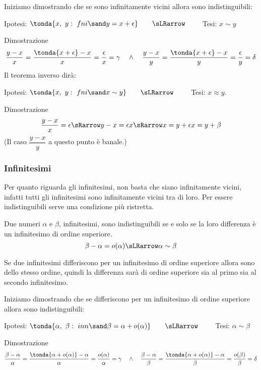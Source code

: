 Iniziamo dimostrando che se sono infinitamente vicini allora sono 
indistinguibili:
\begin{center}
Ipotesi: \(\tonda{x,~y:\ fni \sand y = x+\epsilon} \qquad \sLRarrow \qquad\) 
Tesi: \(x \sim y\)
\end{center}
Dimostrazione
\[\frac{y-x}{x}=\frac{\tonda{x+\epsilon}-x}{x} = 
\frac{\epsilon}{x}= \gamma \quad \wedge \quad 
\frac{y-x}{y}=\frac{\tonda{x+\epsilon}-x}{y} = 
\frac{\epsilon}{y}= \delta
\]
Il teorema inverso dirà:
\begin{center}
Ipotesi: \(\tonda{x,~y:\ fni \sand x \sim y} \qquad \sLRarrow \qquad\) 
Tesi: \(x \approx y\).
\end{center}
Dimostrazione
\[\frac{y-x}{x} = \epsilon
\sRarrow y-x=\epsilon x \sRarrow x=y+\epsilon x=y+\beta
\]
(Il caso $\dfrac{y-x}{y}$ a questo punto è banale.)

\subsubsection{Infinitesimi}
\label{subsubsec:insnum_infinitesimi}

Per quanto riguarda gli infinitesimi, non basta che siano infinitamente 
vicini, infatti tutti gli infinitesimi sono infinitamente vicini tra di loro.
Per essere indistinguibili serve una condizione più ristretta.

\begin{teorema}
Due numeri \(\alpha\) e \(\beta\), infinitesimi, 
sono indistinguibili se e solo se la loro differenza è un infinitesimo di 
ordine superiore.
\[\beta-\alpha = o(\alpha) \sLRarrow \alpha \sim \beta\] 
\end{teorema}

\begin{osservazione}
 Se due infinitesimi differiscono per un infinitesimo di ordine superiore 
allora sono dello stesso ordine, quindi la differenza sarà di ordine 
superiore sia al primo sia al secondo infinitesimo.
\end{osservazione}

Iniziamo dimostrando che se differiscono per un infinitesimo di ordine 
superiore allora sono indistinguibili:
\begin{center}
Ipotesi: \(\tonda{\alpha,~\beta:\ inn \sand \beta = \alpha +o(\alpha)}
\qquad \sLRarrow\qquad\) 
Tesi: \(\alpha \sim \beta\)
\end{center}
Dimostrazione
\[\frac{\beta-\alpha}{\alpha}=
\frac{\tonda{\alpha +o(\alpha)}-\alpha}{\alpha} = 
\frac{o(\alpha)}{\alpha}= \gamma \quad \wedge \quad 
\frac{\beta-\alpha}{\beta}=
\frac{\tonda{\alpha +o(\alpha)}-\alpha}{\beta} = 
\frac{o(\beta)}{\beta}= \delta
\]

